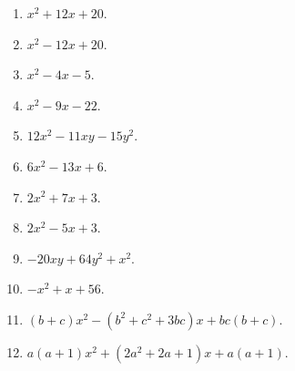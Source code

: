 \documentclass[a4paper,12pt]{article}
\begin{document}
\begin{multicols}{2}
	\begin{enumerate}
		\item $x ^ { 2 } + 1 2 x + 2 0$.
		
		\item $x ^ { 2 } - 1 2 x + 2 0$.
		
		\item $x ^ { 2 } - 4 x - 5$.
		
		\item $x ^ {2} - 9 x - 2 2$.
		
		\item $1 2 x ^ 2 - 1 1 x y - 1 5 y ^ 2$.
		
		\item $6x^2-13x+6$.
		
		\item $2x^2+7x+3$.
		
		\item $2x^2-5x+3$.
		
		\item $-20xy+64y^2+x^2$.
		
		\item $-x^2+x+56$.
		
		\item $( b + c ) x ^ { 2 } - ( b ^ { 2 } + c ^ { 2 } + 3 b c ) x + b c ( b + c )$.
		
		\item $a ( a + 1 ) x ^ { 2 } + ( 2 a ^ { 2 } + 2 a + 1 ) x + a ( a + 1 )$.
	\end{enumerate}
\end{multicols}
\end{document}
